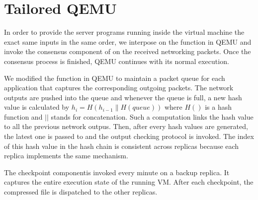 \section{Tailored QEMU} \label{sec:qemu}

In order to provide the server programs running inside the virtual machine the exact same 
inputs in the same order, we interpose on the \tapsend function in QEMU and invoke the 
\paxos consensus component of \smrsystem on the received networking packets. Once the 
consensus process is finished, QEMU continues with its normal execution. 

We modified the \taprecv function in QEMU to maintain a packet queue for each application 
that captures the corresponding outgoing packets. The network outputs are pushed into the 
queue and whenever the queue is full, a new hash value is calculated by 
$h_i=H(h_{i-1}\|H(queue))$ where $H()$ is a hash function and $||$ stands for concatenation. 
Such a computation links the hash value to all the previous network outpus. Then, after every 
\thashcomp hash values are generated, the latest one is passed to \smrsystem and the output 
checking protocol is invoked. The index of this hash value in the hash chain is 
consistent across replicas because each replica implements the same mechanism. 


The checkpoint componentis invoked every minute on a backup replica. It captures the entire 
execution state of the running VM. After each checkpoint, the compressed file is dispatched 
to the other replicas. 
